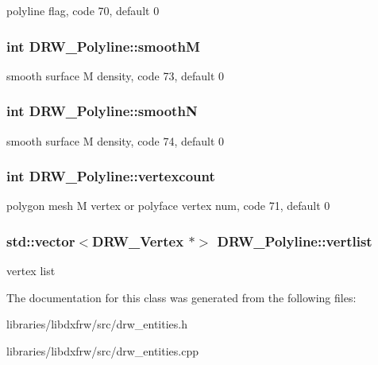 polyline flag, code 70, default 0 \hypertarget{classDRW__Polyline_aa244ad2243bc7312e01b39876da95edb}{
\subsubsection[{smooth\-M}]{\setlength{\rightskip}{0pt plus 5cm}int D\-R\-W\-\_\-\-Polyline\-::smooth\-M}}\label{classDRW__Polyline_aa244ad2243bc7312e01b39876da95edb}
smooth surface M density, code 73, default 0 \hypertarget{classDRW__Polyline_a35895911a129d179e1197efa9ca0ec34}{
\subsubsection[{smooth\-N}]{\setlength{\rightskip}{0pt plus 5cm}int D\-R\-W\-\_\-\-Polyline\-::smooth\-N}}\label{classDRW__Polyline_a35895911a129d179e1197efa9ca0ec34}
smooth surface M density, code 74, default 0 \hypertarget{classDRW__Polyline_ac4bec6f33dd2f8967548d7163525537e}{
\subsubsection[{vertexcount}]{\setlength{\rightskip}{0pt plus 5cm}int D\-R\-W\-\_\-\-Polyline\-::vertexcount}}\label{classDRW__Polyline_ac4bec6f33dd2f8967548d7163525537e}
polygon mesh M vertex or polyface vertex num, code 71, default 0 \hypertarget{classDRW__Polyline_ab001a6b7d6fec6298f52cc1f47df6c87}{
\subsubsection[{vertlist}]{\setlength{\rightskip}{0pt plus 5cm}std\-::vector$<${\bf D\-R\-W\-\_\-\-Vertex} $\ast$$>$ D\-R\-W\-\_\-\-Polyline\-::vertlist}}\label{classDRW__Polyline_ab001a6b7d6fec6298f52cc1f47df6c87}
vertex list 

The documentation for this class was generated from the following files\-:\begin{DoxyCompactItemize}
\item 
libraries/libdxfrw/src/drw\-\_\-entities.\-h\item 
libraries/libdxfrw/src/drw\-\_\-entities.\-cpp\end{DoxyCompactItemize}
